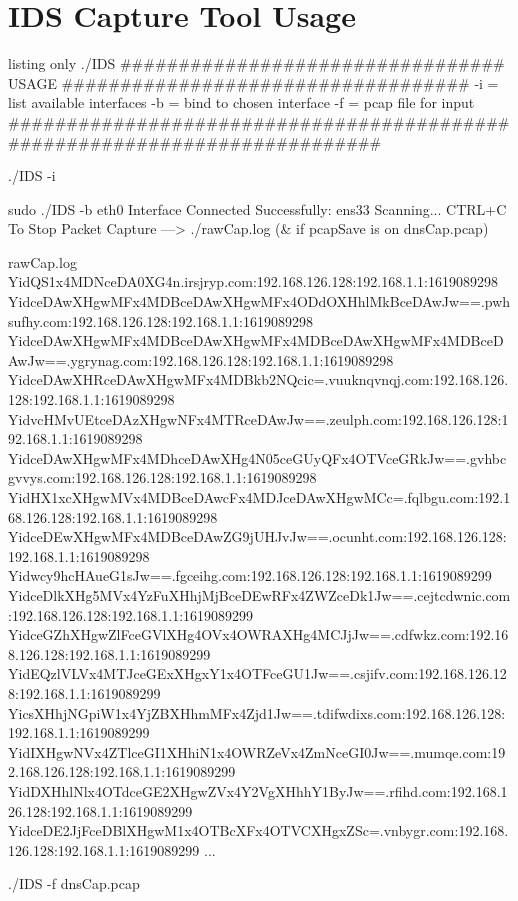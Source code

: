 
\section{IDS Capture Tool Usage}

\begin{tcblisting}{listing only}
./IDS
################################# USAGE ###################################
-i = list available interfaces
-b = bind to chosen interface
-f = pcap file for input
###########################################################################

./IDS -i


sudo ./IDS -b eth0
Interface Connected Successfully: ens33
Scanning... CTRL+C To Stop Packet Capture 
---> ./rawCap.log   (\& if pcapSave is on dnsCap.pcap)

rawCap.log
    YidQS1x4MDNceDA0XG4n.irsjryp.com:192.168.126.128:192.168.1.1:1619089298
    YidceDAwXHgwMFx4MDBceDAwXHgwMFx4ODdOXHhlMkBceDAwJw==.pwhsufhy.com:192.168.126.128:192.168.1.1:1619089298
    YidceDAwXHgwMFx4MDBceDAwXHgwMFx4MDBceDAwXHgwMFx4MDBceDAwJw==.ygrynag.com:192.168.126.128:192.168.1.1:1619089298
    YidceDAwXHRceDAwXHgwMFx4MDBkb2NQcic=.vuuknqvnqj.com:192.168.126.128:192.168.1.1:1619089298
    YidvcHMvUEtceDAzXHgwNFx4MTRceDAwJw==.zeulph.com:192.168.126.128:192.168.1.1:1619089298
    YidceDAwXHgwMFx4MDhceDAwXHg4N05ceGUyQFx4OTVceGRkJw==.gvhbcgvvys.com:192.168.126.128:192.168.1.1:1619089298
    YidHX1xcXHgwMVx4MDBceDAwcFx4MDJceDAwXHgwMCc=.fqlbgu.com:192.168.126.128:192.168.1.1:1619089298
    YidceDEwXHgwMFx4MDBceDAwZG9jUHJvJw==.ocunht.com:192.168.126.128:192.168.1.1:1619089298
    Yidwcy9hcHAueG1sJw==.fgceihg.com:192.168.126.128:192.168.1.1:1619089299
    YidceDlkXHg5MVx4YzFuXHhjMjBceDEwRFx4ZWZceDk1Jw==.cejtcdwnic.com:192.168.126.128:192.168.1.1:1619089299
    YidceGZhXHgwZlFceGVlXHg4OVx4OWRAXHg4MCJjJw==.cdfwkz.com:192.168.126.128:192.168.1.1:1619089299
    YidEQzlVLVx4MTJceGExXHgxY1x4OTFceGU1Jw==.csjifv.com:192.168.126.128:192.168.1.1:1619089299
    YicsXHhjNGpiW1x4YjZBXHhmMFx4Zjd1Jw==.tdifwdixs.com:192.168.126.128:192.168.1.1:1619089299
    YidIXHgwNVx4ZTlceGI1XHhiN1x4OWRZeVx4ZmNceGI0Jw==.mumqe.com:192.168.126.128:192.168.1.1:1619089299
    YidDXHhlNlx4OTdceGE2XHgwZVx4Y2VgXHhhY1ByJw==.rfihd.com:192.168.126.128:192.168.1.1:1619089299
    YidceDE2JjFceDBlXHgwM1x4OTBcXFx4OTVCXHgxZSc=.vnbygr.com:192.168.126.128:192.168.1.1:1619089299
    ...


./IDS -f dnsCap.pcap
\end{tcblisting}


